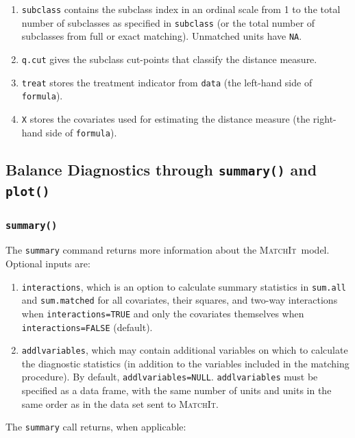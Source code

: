 \documentclass[oneside,letterpaper,titlepage]{article}
\newcommand{\MatchIt}{\textsc{MatchIt}}
\begin{document}
\begin{enumerate}
\item \texttt{subclass} contains the subclass index in an ordinal
  scale from 1 to the total number of subclasses as specified in
  \texttt{subclass} (or the total number of subclasses from full or
  exact matching).  Unmatched units have \texttt{NA}.
  
\item \texttt{q.cut} gives the subclass cut-points that classify the
  distance measure.
  
\item \texttt{treat} stores the treatment indicator from \texttt{data}
  (the left-hand side of \texttt{formula}).
 
\item \texttt{X} stores the covariates used for estimating the
  distance measure (the right-hand side of \texttt{formula}).
\end{enumerate}


\subsection{Balance Diagnostics through {\tt summary()} and {\tt
    plot()}}
\label{cmd:sum}

\subsubsection{{\tt summary()}}
The \texttt{summary} command returns more information about the
\MatchIt\ model.  Optional inputs are:

\begin{enumerate}
\item \texttt{interactions}, which is an option to calculate summary
  statistics in \texttt{sum.all} and \texttt{sum.matched} for all
  covariates, their squares, and two-way interactions when
  \texttt{interactions=TRUE} and only the covariates themselves when
  \texttt{interactions=FALSE} (default).
\item \texttt{addlvariables}, which may contain additional variables
  on which to calculate the diagnostic statistics (in addition to the
  variables included in the matching procedure).  By default,
  \texttt{addlvariables=NULL}.  \texttt{addlvariables} must be
  specified as a data frame, with the same number of units and units
  in the same order as in the data set sent to \MatchIt .
\end{enumerate}

The \texttt{summary} call returns, when applicable:
\end{document}
